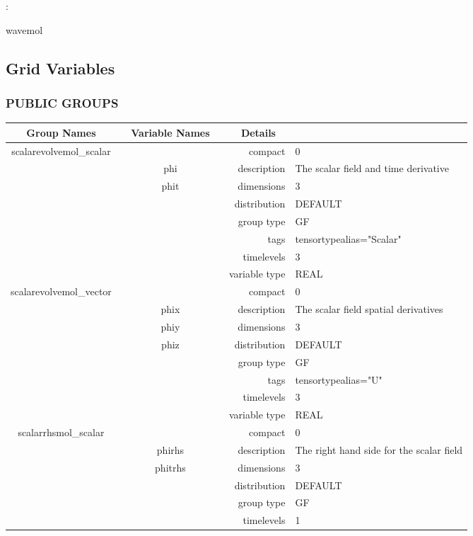 : 

wavemol
\vspace{2mm}
\subsection*{Grid Variables}
\vspace{5mm}\subsubsection{PUBLIC GROUPS}

\vspace{5mm}

\begin{tabular*}{150mm}{|c|c@{\extracolsep{\fill}}|rl|} \hline 
~ {\bf Group Names} ~ & ~ {\bf Variable Names} ~  &{\bf Details} ~ & ~\\ 
\hline 
scalarevolvemol\_scalar &  & compact & 0 \\ 
 & phi & description & The scalar field and time derivative \\ 
 & phit & dimensions & 3 \\ 
 &  & distribution & DEFAULT \\ 
 &  & group type & GF \\ 
 &  & tags & tensortypealias="Scalar" \\ 
 &  & timelevels & 3 \\ 
 &  & variable type & REAL \\ 
\hline 
scalarevolvemol\_vector &  & compact & 0 \\ 
 & phix & description & The scalar field spatial derivatives \\ 
 & phiy & dimensions & 3 \\ 
 & phiz & distribution & DEFAULT \\ 
 &  & group type & GF \\ 
 &  & tags & tensortypealias="U" \\ 
 &  & timelevels & 3 \\ 
 &  & variable type & REAL \\ 
\hline 
scalarrhsmol\_scalar &  & compact & 0 \\ 
 & phirhs & description & The right hand side for the scalar field \\ 
 & phitrhs & dimensions & 3 \\ 
 &  & distribution & DEFAULT \\ 
 &  & group type & GF \\ 
 &  & timelevels & 1 \\ 

\end{tabular*}
